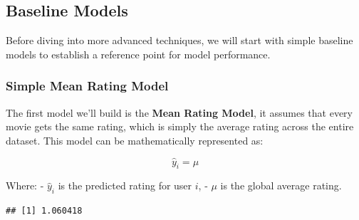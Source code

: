 \documentclass[
]{article}
\newenvironment{Shaded}{}{}
\newcommand{\CommentTok}[1]{\textcolor[rgb]{0.38,0.63,0.69}{\textit{#1}}}
\newcommand{\ControlFlowTok}[1]{\textcolor[rgb]{0.00,0.44,0.13}{\textbf{#1}}}
\newcommand{\DecValTok}[1]{\textcolor[rgb]{0.25,0.63,0.44}{#1}}
\newcommand{\FunctionTok}[1]{\textcolor[rgb]{0.02,0.16,0.49}{#1}}
\newcommand{\NormalTok}[1]{#1}
\newcommand{\OtherTok}[1]{\textcolor[rgb]{0.00,0.44,0.13}{#1}}
\newcommand{\SpecialCharTok}[1]{\textcolor[rgb]{0.25,0.44,0.63}{#1}}
\begin{document}
\subsection{Baseline Models}\label{baseline-models}

Before diving into more advanced techniques, we will start with simple
baseline models to establish a reference point for model performance.

\subsubsection{Simple Mean Rating Model}\label{simple-mean-rating-model}

The first model we'll build is the \textbf{Mean Rating Model}, it
assumes that every movie gets the same rating, which is simply the
average rating across the entire dataset. This model can be
mathematically represented as:

\[
\hat{y}_{i} = \mu
\]

Where: - \(\hat{y}_{i}\) is the predicted rating for user \(i\), -
\(\mu\) is the global average rating.

\begin{Shaded}
\end{Shaded}

\begin{verbatim}
## [1] 1.060418
\end{verbatim}
\end{document}
